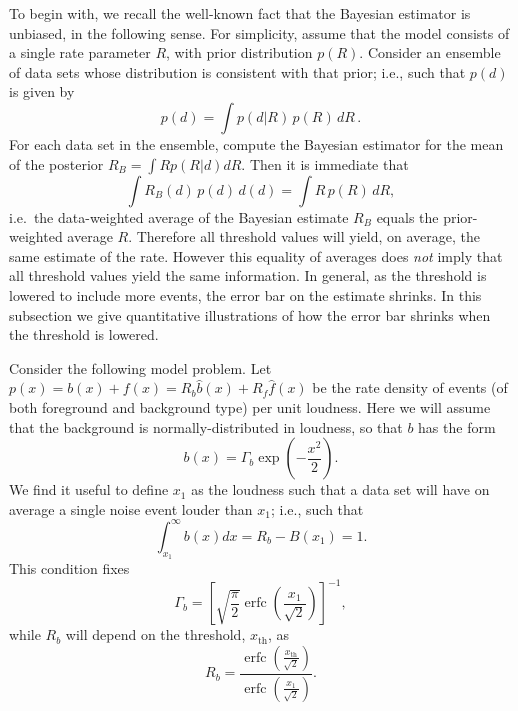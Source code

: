\documentclass[aps,prd,reprint,nofootinbib]{revtex4-1}
\DeclareMathOperator{\erfc}{erfc}
\begin{document}
To begin with, we recall the well-known fact that the Bayesian
estimator is unbiased, in the following sense.  For simplicity, assume
that the model consists of a single rate parameter $R$, with prior
distribution $p(R)$.  Consider an ensemble of data sets whose
distribution is consistent with that prior; i.e., such that $p(d)$ is
given by
\begin{equation}
 p(d) = \int{ p(d|R)\,p(R)\, dR}\, .  
\end{equation}
For each data set in the ensemble, compute the Bayesian estimator 
for the mean of the posterior $R_{B} = \int{ R p(R|d) dR}$.  Then it is immediate that
\begin{equation}
\int{R_{B}(d)\, p(d)\,d(d) }= \int{ R\, p(R) \,dR},
\end{equation}
i.e.\ the data-weighted average of the Bayesian estimate $R_{B}$
equals the prior-weighted average $R$.  Therefore all threshold values
will yield, on average, the same estimate of the rate.  However this
equality of averages does {\it not} imply that all threshold values
yield the same information. In general, as the threshold is lowered to
include more events, the error bar on the estimate shrinks.  In this
subsection we give quantitative illustrations of how the error bar
shrinks when the threshold is lowered.

Consider the following model problem.  Let $p(x) = b(x) + f(x) = R_b
\hat{b}(x) + R_f \hat{f}(x)$ be the rate density of events (of both
foreground and background type) per unit loudness.  Here we will
assume that the background is normally-distributed in loudness, so
that $b$ has the form
\begin{equation}
b(x) = \Gamma_b \exp \left(- \frac{x^2}{2} \right).
\end{equation}
We find it useful to define $x_1$ as the loudness such that a data set
will have on average a single noise event louder than $x_1$; i.e.,
such that 
\begin{equation}
 \int_{x_1}^{\infty} b(x) dx = R_b - B\left(x_1\right) = 1.
\end{equation}
This condition fixes 
\begin{equation}
  \Gamma_b = \left[ \sqrt{\frac{\pi}{2}} \erfc\left(
    \frac{x_1}{\sqrt{2}} \right) \right]^{-1},
\end{equation}
while $R_b$ will depend on the threshold, $x_\mathrm{th}$, as 
\begin{equation}
  R_b = \frac{\erfc\left( \frac{x_\mathrm{th}}{\sqrt{2}}
    \right)}{\erfc\left( \frac{x_1}{\sqrt{2}} \right)}.
\end{equation}
\end{document}
